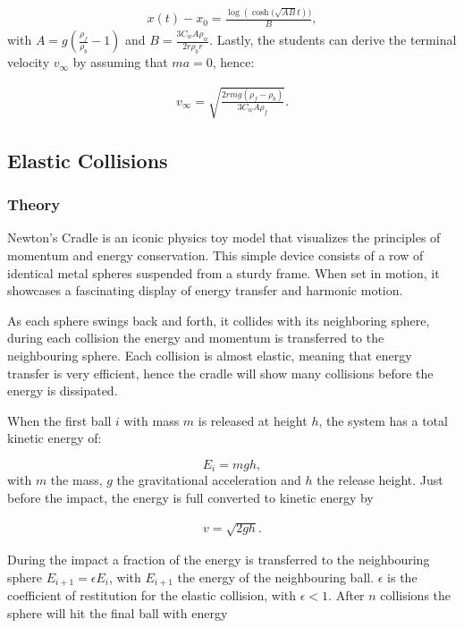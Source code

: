 \documentclass{article}
\begin{document}
\begin{align}
    x(t) - x_0 = \frac{\log{(\cosh{(\sqrt{AB}t})})}{B},
\end{align}
with $A = g\left(\frac{\rho_f}{\rho_b}-1\right)$ and $B = \frac{3C_w A \rho_w}{2r\rho_b r}$. 
Lastly, the students can derive the terminal velocity $v_{\infty}$ by assuming that $ma = 0$, hence:

\begin{align}
    v_{\infty} = \sqrt{\frac{2rmg\left(\rho_f-\rho_b\right)}{3C_wA\rho_f}}.
\end{align}




\newpage

\subsection{Elastic Collisions}
\subsubsection{Theory}
Newton's Cradle is an iconic physics toy model that visualizes the principles of momentum and energy conservation. This simple device consists of a row of identical metal spheres suspended from a sturdy frame. When set in motion, it showcases a fascinating display of energy transfer and harmonic motion.

As each sphere swings back and forth, it collides with its neighboring sphere, during each collision the energy and momentum is transferred to the neighbouring sphere. Each collision is almost elastic, meaning that energy transfer is very efficient, hence the cradle will show many collisions before the energy is dissipated.

When the first ball $i$ with mass $m$ is released at height $h$, the system has a total kinetic energy of:

\begin{equation}
    E_i = mgh,
\end{equation}
with $m$ the mass, $g$ the gravitational acceleration and $h$ the release height. Just before the impact, the energy is full converted to kinetic energy by

\begin{align}
    v = \sqrt{2gh}.
\end{align}

During the impact a fraction of the energy is transferred to the neighbouring sphere $E_{i+1} = \epsilon E_i$, with $E_{i+1}$ the energy of the neighbouring ball. $\epsilon$ is the coefficient of restitution for the elastic collision, with $\epsilon<1$. After $n$ collisions the sphere will hit the final ball with energy 
\end{document}
